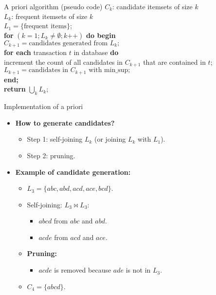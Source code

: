 \documentclass[aspectratio=169,t]{beamer}
\begin{document}
  {
    \begin{frame}{A priori algorithm (pseudo code)}
    $C_k$: candidate itemsets of size $k$\\
    $L_k$: frequent itemsets of size $k$\\[0.5cm]

    $L_1 = \{\text{frequent items}\}$;\\[0.5cm]
    \textbf{for} $(k=1; L_k \neq \emptyset; k\texttt{++})$ \textbf{do begin}\\
    \hspace{1cm} $C_{k+1} = \text{candidates generated from } L_k;$\\
    \hspace{1cm} \textbf{for each} transaction $t$ in database \textbf{do}\\
    \hspace{2cm} increment the count of all candidates in $C_{k+1}$ that are contained in $t$;\\[0.1cm]
    \hspace{1cm}$L_{k+1} = \text{candidates in } C_{k+1} \text{ with min\_sup};$\\
    \textbf{end;}\\[0.1cm]
    \textbf{return} $\bigcup_k L_k$;
    \end{frame}
  }

  {
    \begin{frame}{Implementation of a priori}
    \begin{itemize}
      \item \textbf{\color{airforceblue}How to generate candidates?}
      \begin{itemize}
        \item Step 1: self-joining $L_k$ (or joining $L_k$ with $L_1$).
        \item Step 2: pruning.
      \end{itemize}
      \item \textbf{Example of candidate generation:}
      \begin{itemize}
        \item $L_3 = \{abc, abd, acd, ace, bcd\}$.
        \item Self-joining: $L_3 \bowtie L_3$:
        \begin{itemize}
          \item $abcd$ from $abc$ and $abd$.
          \item $acde$ from $acd$ and $ace$.
        \end{itemize}
        \item \textbf{Pruning:}
        \begin{itemize}
          \item $acde$ is removed because $ade$ is not in $L_3$.
        \end{itemize}
        \item $C_4 = \{abcd\}$.
      \end{itemize}
    \end{itemize}    
    \end{frame}
  }
\end{document}
